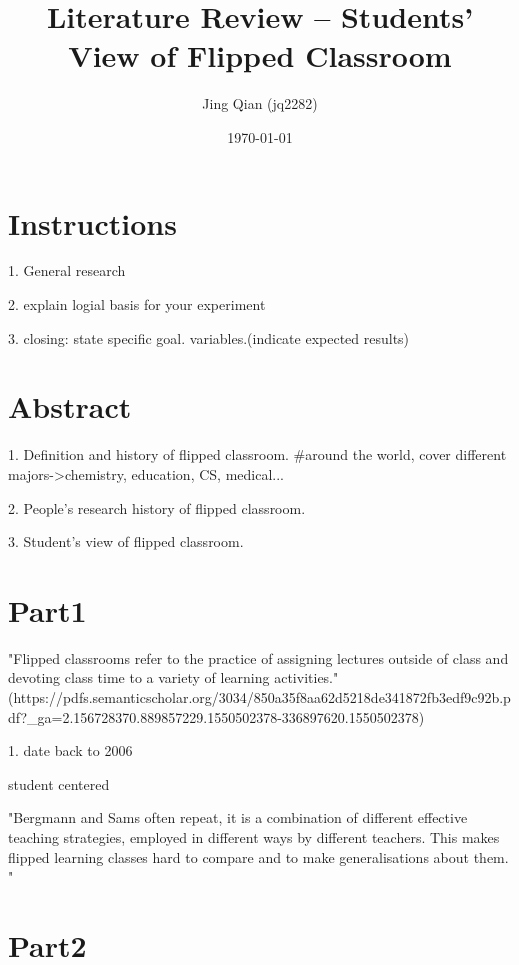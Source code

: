 \documentclass[onecolumn,aps,prd,groupedaddress,nofootinbib,notitlepage,12pt]{revtex4-1}
\begin{document}
\title{Literature Review -- Students' View of Flipped Classroom}

\author{Jing Qian (jq2282)}

\date{\today}

\maketitle
\section{Instructions}
1. General research 

2. explain logial basis for your experiment

3. closing: state specific goal. variables.(indicate expected results)


\section{Abstract}
1. Definition and history of flipped classroom.
#around the world, cover different majors->chemistry, education, CS, medical...

2. People's research history of flipped classroom.

3. Student's view of flipped classroom.

\section{Part1}

"Flipped classrooms refer to the practice of assigning lectures outside of class and
devoting class time to a variety of learning activities." (https://pdfs.semanticscholar.org/3034/850a35f8aa62d5218de341872fb3edf9c92b.pdf?_ga=2.156728370.889857229.1550502378-336897620.1550502378)

1. date back to 2006

student centered

"Bergmann and Sams often
repeat, it is a combination of different effective teaching strategies, employed
in different ways by different teachers. This makes flipped learning classes hard
to compare and to make generalisations about them. "


\section{Part2}
\end{document}
